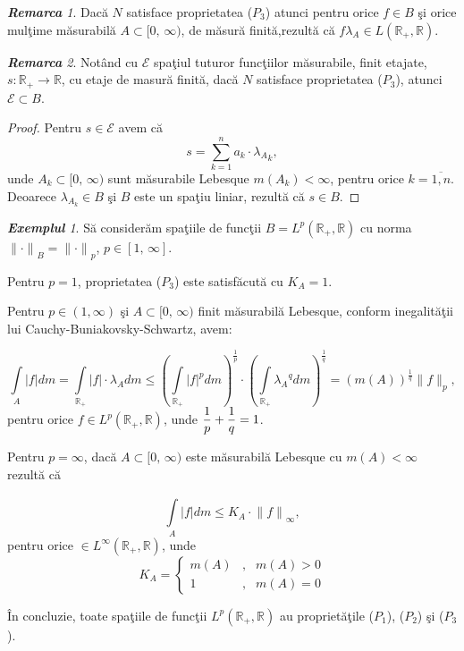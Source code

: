 \documentclass[ a4paper, 12pt]{report}
\theoremstyle{definition}
\theoremstyle{remark}
\newtheorem{remarc}{\bf Remarca}[section]
\newtheorem{exemple}{\bf Exemplul}[section]
\numberwithin{equation}{section}
\begin{document}
\begin{remarc}
Dac\u a $N$ satisface proprietatea ($P_3$) atunci pentru orice $f \in B$ \c si orice mul\c time m\u asurabil\u a $A \subset [0, \, \infty)$, de m\u asur\u a finit\u a,rezult\u  a c\u a $f\lambda_A \in L(\mathbb{R}_+, \mathbb{R})$.
\end{remarc}

\begin{remarc}
Not\^ and cu $\mathcal{E}$ spa\c tiul tuturor func\c tiilor m\u asurabile, finit etajate, $s:\mathbb{R_+} \rightarrow \mathbb{R}$, cu etaje de masur\u a finit\u a, dac\u a $N$ satisface proprietatea ($P_3$), atunci $\mathcal{E} \subset B$.
\end{remarc}

\begin{proof}
Pentru $s \in \mathcal{E}$ avem c\u a
$$s=\sum\limits_{k=1}^{n}{a_k \cdot {\lambda_A}_k},$$ unde $A_k \subset [0, \, \infty)$ sunt m\u asurabile Lebesque $m(A_k)<\infty$, pentru orice $k=\overline{1, n}$.
Deoarece $\lambda_{A_k} \in B$ \c si $B$ este un spa\c tiu liniar, rezult\u a c\u a $s \in B$.
\end{proof}


\begin{exemple} S\u a consider\u am spa\c tiile de func\c tii  $B = L^p(\mathbb{R_+,\mathbb{R}})$ cu  norma ${\lVert \cdot \rVert}_B = {\lVert \cdot \rVert}_p$, $p \in [1, \, \infty]$.

Pentru $p=1$,
proprietatea ($P_3$) este satisf\u acut\u a cu $K_A = 1$.

Pentru $p \in (1,\infty)$ \c si $A \subset [0, \, \infty)$ finit m\u asurabil\u a Lebesque, conform inegalit\u a\c tii lui Cauchy-Buniakovsky-Schwartz, avem:

$$\int\limits_{A}^{}{\lvert f \rvert} dm = \int\limits_{\mathbb{R_+}}^{}{\lvert f \rvert \cdot \lambda_A} d m \leq {(\int\limits_{\mathbb{R_+}}^{}{{\lvert f \rvert}^p}dm)}^{\frac{1}{p}} \cdot {(\int\limits_{\mathbb{R_+}}^{}{{\lambda_A}^q}dm)}^{\frac{1}{q}}={(m(A))}^{\frac{1}{q}}\lVert f\rVert_p,$$
pentru orice $f \in L^p(\mathbb{R_+,\mathbb{R}})$, unde $\displaystyle\frac{1}{p} + \displaystyle\frac{1}{q} = 1$.

Pentru $p=\infty$, dac\u a $ A \subset [0, \, \infty)$ este m\u asurabil\u a Lebesque cu $m(A)<\infty$ rezult\u a c\u a

$$ \int\limits_{A}^{}{\lvert f \rvert} dm \leq K_A \cdot {\lVert f \rVert}_\infty,$$ pentru orice $\in L^\infty(\mathbb{R}_+,\mathbb{R})$, unde
$$K_A = \left\{ \begin{array}{lcl} m(A)&,& m(A) > 0 \\
  1 &,& m(A)=0 \end{array} \right.$$

\^In concluzie, toate spa\c tiile de func\c tii $L^p(\mathbb{R_+,\mathbb{R}})$ au propriet\u a\c tile ($P_1$), ($P_2$) \c si ($P_3$).
\end{exemple}
\end{document}

